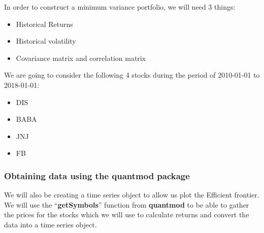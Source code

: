 \documentclass[]{article}
\providecommand{\tightlist}{%
  \setlength{\itemsep}{0pt}\setlength{\parskip}{0pt}}
\begin{document}
In order to construct a minimum variance portfolio, we will need 3
things:

\begin{itemize}
\tightlist
\item
  Historical Returns
\item
  Historical volatility
\item
  Covariance matrix and correlation matrix
\end{itemize}

We are going to consider the following 4 stocks during the period of
2010-01-01 to 2018-01-01:

\begin{itemize}
\tightlist
\item
  DIS
\item
  BABA
\item
  JNJ
\item
  FB
\end{itemize}

\subsubsection{Obtaining data using the quantmod
package}\label{obtaining-data-using-the-quantmod-package}

We will also be creating a time series object to allow us plot the
Efficient frontier. We will use the ``\textbf{getSymbols}'' function
from \textbf{quantmod} to be able to gather the prices for the stocks
which we will use to calculate returns and convert the data into a time
series object.
\end{document}
